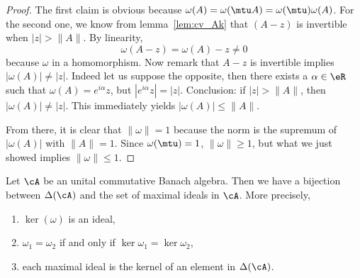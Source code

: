 \begin{proof}
The first claim is obvious because $\omega(A)=\omega(\mtu A)=\omega(\mtu)\omega(A)$.  For the second one, we know from lemma~\ref{lem:cv_Ak} that $(A-z)$ is invertible when $|z|>\|A\|$. By
linearity,
\[
\omega(A-z)=\omega(A)-z\neq 0
\]
because $\omega$ in a homomorphism. Now remark that $A-z$ is invertible implies $|\omega(A)|\neq |z|$. Indeed let us suppose the opposite, then there exists a $\alpha\in\eR$ such that $\omega(A)=e^{i\alpha}z$, but $|e^{i\alpha}z|=|z|$. Conclusion: if $|z|>\|A\|$, then $|\omega(A)|\neq|z|$. This immediately yields $|\omega(A)|\leq\|A\|$.

From there, it is clear that $\|\omega\|=1$ because the norm is the supremum of $|\omega(A)|$ with $\|A\|=1$. Since $\omega(\mtu)=1$, $\|\omega\|\geq 1$, but what we just showed implies $\|\omega\|\leq 1$.

\end{proof}

\begin{theorem}
Let $\cA$ be an unital commutative Banach algebra. Then we have a bijection between $\Delta(\cA)$ and the set of maximal ideals in $\cA$. More precisely,

\begin{enumerate}
\item $\ker(\omega)$ is an ideal,                   \label{enuei}
\item $\omega_1=\omega_2$ if and only if $\ker\omega_1=\ker\omega_2$,   \label{enueii}
\item each maximal ideal is the kernel of an element in $\Delta(\cA)$.  \label{enueiii}
\end{enumerate}\label{tho:ideal_kernel}
\end{theorem}


